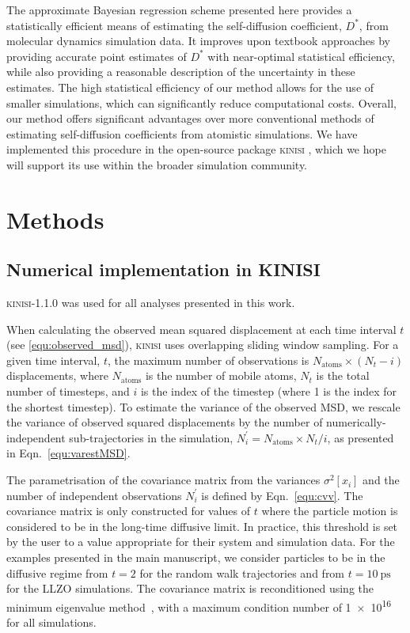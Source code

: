 \documentclass[reprint,superscriptaddress,nobibnotes,amsmath,amssymb,aps,prx,hidelinks]{revtex4-2}
\newcommand{\oMSDi}{\ensuremath{x_i}}
\newcommand{\nind}[1]{\ensuremath{N^\prime_{#1}}}
\newcommand{\D}{\ensuremath{D^*}}
\newcommand{\var}[1]{\ensuremath{\sigma^2[#1]}}
\begin{document}
The approximate Bayesian regression scheme presented here provides a statistically efficient means of estimating the self-diffusion coefficient, $\D$, from molecular dynamics simulation data.
It improves upon textbook approaches by providing accurate point estimates of $\D$ with near-optimal statistical efficiency, while also providing a reasonable description of the uncertainty in these estimates.
The high statistical efficiency of our method allows for the use of smaller simulations, which can significantly reduce computational costs.
Overall, our method offers significant advantages over more conventional methods of estimating self-diffusion coefficients from atomistic simulations.
We have implemented this procedure in the open-source package \textsc{kinisi} \cite{McCluskey2024}, which we hope will support its use within the broader simulation community.

\section{Methods}

\subsection{Numerical implementation in KINISI}
\label{sec:implementation}
\textsc{kinisi}-1.1.0 was used for all analyses presented in this work.  

When calculating the observed mean squared displacement at each time interval $t$ (see \cref{equ:observed_msd}), \textsc{kinisi} uses overlapping sliding window sampling.
For a given time interval, $t$, the maximum number of observations is $N_{\mathrm{atoms}} \times (N_{t} - i)$ displacements, where $N_{\mathrm{atoms}}$ is the number of mobile atoms, $N_{t}$ is the total number of timesteps, and $i$ is the index of the timestep (where \num{1} is the index for the shortest timestep).
To estimate the variance of the observed MSD, we rescale the variance of observed squared displacements by the number of numerically-independent sub-trajectories in the simulation, $\nind{i} = N_{\mathrm{atoms}} \times N_{t} / i$, as presented in Eqn.~\ref{equ:varestMSD}.  

The parametrisation of the covariance matrix from the variances $\var{\oMSDi}$ and the number of independent observations $\nind{i}$ is defined by Eqn.~\ref{equ:cvv}. 
The covariance matrix is only constructed for values of $t$ where the particle motion is considered to be in the long-time diffusive limit.
In practice, this threshold is set by the user to a value appropriate for their system and simulation data. 
For the examples presented in the main manuscript, we consider particles to be in the diffusive regime from $t=\num{2}$ for the random walk trajectories and from $t=\SI{10}{\pico\second}$ for the LLZO simulations.
The covariance matrix is reconditioned using the minimum eigenvalue method~\cite{TabeartEtAl_TellusDynMeteorolOceanogr2020}, with a maximum condition number of \num{1e16} for all simulations.
\end{document}
